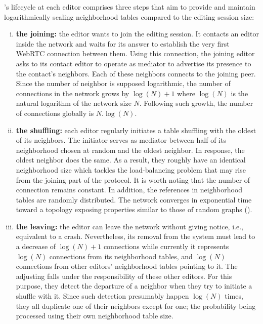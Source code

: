 \SPRAY's lifecycle at each editor comprises three steps that aim to provide and
maintain logarithmically scaling neighborhood tables compared to the editing
session size:
\begin{enumerate}[(i)]
\item \textbf{the joining:} the editor wants to join the editing session. It
  contacts an editor inside the network and waits for its answer to establish
  the very first WebRTC connection between them. Using this connection, the
  joining editor asks to its contact editor to operate as mediator to advertise
  its presence to the contact's neighbors. Each of these neighbors connects to
  the joining peer. Since the number of neighbor is supposed logarithmic, the
  number of connections in the network grows by $\log(N)+1$ where $\log(N)$ is
  the natural logarithm of the network size $N$. Following such growth, the
  number of connections globally is $N.\log(N)$.
\item \textbf{the shuffling:} each editor regularly initiates a table shuffling
  with the oldest of its neighbors. The initiator serves as mediator between
  half of its neighborhood chosen at random and the oldest neighbor. In
  response, the oldest neighbor does the same. As a result, they roughly have an
  identical neighborhood size which tackles the load-balancing problem that may
  rise from the joining part of the protocol. It is worth noting that the number
  of connection remains constant. In addition, the references in neighborhood
  tables are randomly distributed. The network converges in exponential time
  toward a topology exposing properties similar to those of random graphs
  (\REF).
\item \textbf{the leaving:} the editor can leave the network without giving
  notice, i.e., equivalent to a crash. Nevertheless, its removal from the system
  must lead to a decrease of $\log(N)+1$ connections while currently it
  represents $\log(N)$ connections from its neighborhood tables, and $\log(N)$
  connections from other editors' neighborhood tables pointing to it. The
  adjusting falls under the responsibility of these other editors. For this
  purpose, they detect the departure of a neighbor when they try to initiate a
  shuffle with it. Since such detection presumably happen $\log(N)$ times, they
  all duplicate one of their neighbors except for one; the probability being
  processed using their own neighborhood table size. 
\end{enumerate}

